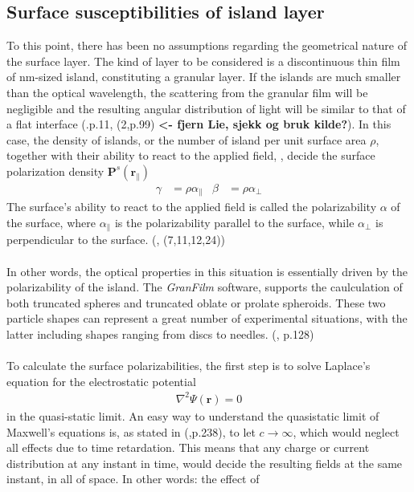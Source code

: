 \subsection{Surface susceptibilities of island layer}
To this point, there has been no assumptions regarding the geometrical nature of the surface layer.
The kind of layer to be considered is a discontinuous thin film of nm-sized island, constituting
a granular layer. If the islands are much smaller than the optical wavelength, the 
scattering from the granular film will be negligible and the resulting angular distribution 
of light will be similar to that of a flat interface (\cite{LieL2010}.p.11, (2,p.99) 
\textbf{<- fjern Lie, sjekk og bruk kilde?}).
In this case, the density of islands, or the number of island per unit surface area $\rho$, together with 
their ability to react to the applied field, ,
decide the surface polarization density $\boldsymbol{P}^s(\boldsymbol{r}_{\parallel})$
\begin{align}
   \gamma &= \rho \alpha_{\parallel}         &\beta &= \rho \alpha_{\perp}
\end{align}
The surface's ability to react to the applied field is called the polarizability $\alpha$ of the surface,
where $\alpha_{\parallel}$ is the polarizability parallel to the surface, while $\alpha_{\perp}$
is perpendicular to the surface. (\cite{Lazzari}, (7,11,12,24))
\\
\\
In other words, the optical properties in this situation is essentially driven by the polarizability
of the island. The \textit{GranFilm} software, supports the caulculation of both truncated spheres 
and truncated oblate or prolate spheroids. These two particle shapes can represent a great 
number of experimental situations, with the latter including shapes ranging from discs to needles.
(\cite{Lazzari2002}, p.128)
\\
\\
To calculate the surface polarizabilities, the first step is to solve Laplace's equation for the
electrostatic potential
\begin{align}
   \nabla^2 \Psi(\boldsymbol{r}) = 0
   \label{laplaceEq}
\end{align}
in the quasi-static limit. An easy way to understand the quasistatic limit of Maxwell's equations is,
as stated in (\cite{Larsson2007},p.238), to let $c \rightarrow \infty$, which would neglect all 
effects due to time retardation. This means that any charge or current distribution at any instant in time, 
would decide the resulting fields at the same instant, in all of space. In other words: the effect of 
